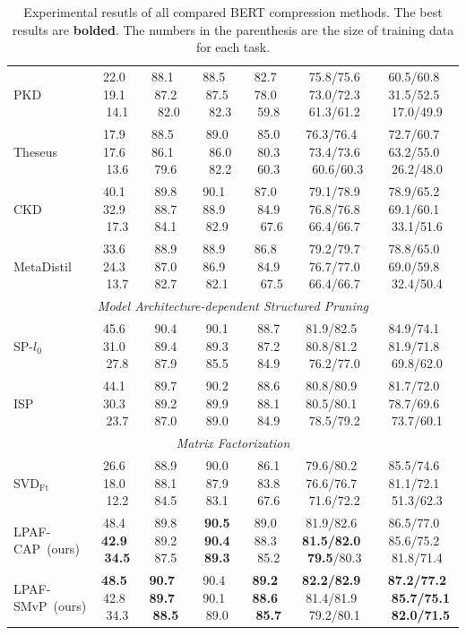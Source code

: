 \documentclass[letterpaper]{article} %
\begin{document}
\begin{table}[thb!]
\begin{tabular}{lcccccc}
			PKD   & 22.0~ 19.1~ 14.1    & 88.1~ 87.2 ~82.0          & 88.5~ 87.5 ~82.3          & 82.7~ 78.0~ 59.8          & 75.8/75.6 ~73.0/72.3~ 61.3/61.2          &60.5/60.8~ 31.5/52.5~ 17.0/49.9                                                    \\
			Theseus &17.9~ 17.6~ 13.6 & 88.5~ 86.1~ 79.6          & 89.0 ~86.0 ~82.2          & 85.0 ~80.3~ 60.3          & 76.3/76.4~ 73.4/73.6 ~60.6/60.3         &72.7/60.7~ 63.2/55.0~ 26.2/48.0                              \\                                                     
			CKD     &40.1~ 32.9~ 17.3   & 89.8 ~88.7~ 84.1          & 90.1~ 88.9~ 82.9          & 87.0~ 84.9 ~67.6          & 79.1/78.9 ~76.8/76.8~ 66.4/66.7          &78.9/65.2~ 69.1/60.1~ 33.1/51.6                                                    \\
			MetaDistil     &33.6~ 24.3~ 13.7    & 88.9 ~87.0~ 82.7          & 88.9~ 86.9~ 82.1          & 86.8~ 84.9 ~67.5          & 79.2/79.7 ~76.7/77.0~ 66.4/66.7          &78.8/65.0~ 69.0/59.8~ 32.4/50.4                                                  \\
			\midrule
			 \multicolumn{7}{c}{\textit{Model Architecture-dependent Structured Pruning}}   \\
			\midrule
			SP-$l_0$     &45.6~ 31.0~ 27.8    & 90.4 ~89.4~ 87.9         & 90.1 ~89.3~ 85.5          & 88.7 ~87.2~ 84.9          & 81.9/82.5~ 80.8/81.2~ 76.2/77.0          &84.9/74.1~ 81.9/71.8~ 69.8/62.0    \\
			ISP    &44.1~ 30.3~ 23.7    & 89.7 ~89.2~ 87.0         & 90.2 ~89.9~ 89.0          & 88.6 ~88.1~ 84.9          & 80.8/80.9~ 80.5/80.1~ 78.5/79.2          & 81.7/72.0~ 78.7/69.6~ 73.7/60.1        \\
			\midrule
		   \multicolumn{7}{c}{\textit{Matrix Factorization}}   \\
			\midrule
			SVD$_\text{Ft}$  &26.6~ 18.0~ 12.2      & 88.9 ~88.1~ 84.5         & 90.0 ~87.9~ 83.1          & 86.1 ~83.8~ 67.6          & 79.6/80.2~ 76.6/76.7~ 71.6/72.2         & 85.5/74.6~ 81.1/72.1~ 51.3/62.3    \\
			LPAF-CAP~(ours)   &48.4~ \textbf{42.9}~\textbf{ 34.5}     &89.8 ~89.2~ 87.5 &\textbf{90.5} ~\textbf{90.4}~ \textbf{89.3}    &89.0~ 88.3~ 85.2 &81.9/82.6~ \textbf{81.5/82.0}~ \textbf{79.5}/80.3    &86.5/77.0~ 85.6/75.2~ 81.8/71.4  \\
			LPAF-SMvP~(ours)   & \textbf{48.5}~ 42.8~ 34.3   & \textbf{90.7~ 89.7~ 88.5} & 90.4~ 90.1~ 89.0 & \textbf{89.2~ 88.6~ 85.7} & \textbf{82.2/82.9}~ 81.4/81.9~ 79.2/80.1& \textbf{87.2/77.2 ~85.7/75.1 ~82.0/71.5}   \\
			\bottomrule
		\end{tabular}
		\caption{Experimental resutls of all compared BERT compression methods. The best results are \textbf{bolded}. The numbers in the parenthesis are the size of training data for each task.}
		\label{table:all}
	\end{table}
	
\end{document}
